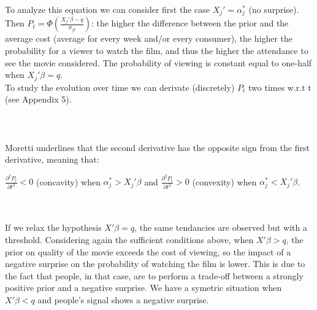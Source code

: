 	To analyze this equation we can consider first the case $X_{j}'=\alpha_{j}^{*}$ (no surprise). Then $P_{t}=\Phi\left(\frac{X_{j}'\beta-q}{\sigma_{j t}}\right)$: the higher the difference between the prior and the average cost (average for every week and/or every consumer), the higher the probability for a viewer to watch the film, and thus the higher the attendance to see the movie considered. The probability of viewing is constant equal to one-half when $X_{j}'\beta=q$.\\
	To study the evolution over time we can derivate (discretely) $P_{t}$ two times w.r.t t (see Appendix 5).\\\\
	\\\\

	Moretti underlines that the second derivative has the opposite sign from the first derivative, meaning that:
	\begin{center}
		$\frac{\partial ^{2} P_{t}}{\partial t^{2}}<0$ (concavity) when $\alpha_{j}^{*}>X_{j}'\beta$ and $\frac{\partial ^{2} P_{t}}{\partial t^{2}}>0$ (convexity) when $\alpha_{j}^{*}<X_{j}'\beta$.
	\end{center}
	\\\\
	If we relax the hypothesis $X'\beta=q$, the same tendancies are observed but with a threshold. Considering again the sufficient conditions above, when $X'\beta>q$, the prior on quality of the movie exceeds the cost of viewing, so the impact of a negative surprise on the probability of watching the film is lower. This is due to the fact that people, in that case, are to perform a trade-off between a strongly positive prior and a negative surprise. We have a symetric situation when $X'\beta<q$ and people's signal shows a negative surprise.
	
